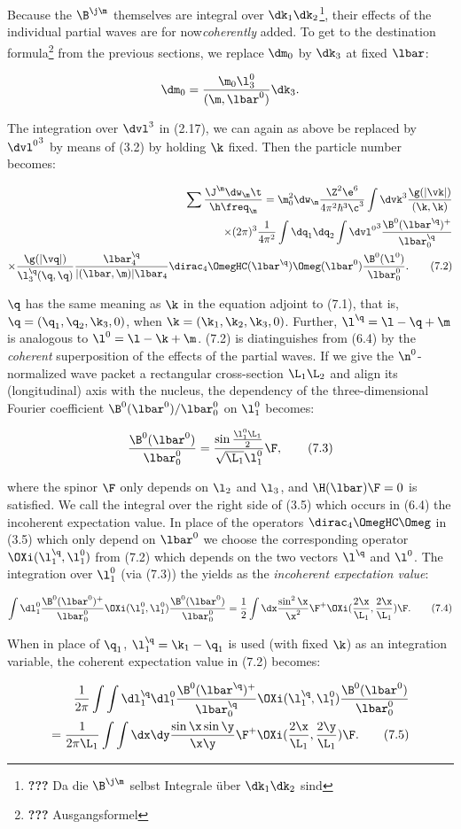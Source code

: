 \documentclass{article}
\newcommand{\WTF}[1]{\footnote{\textbf{???} #1}}
\newcommand{\nequ}[2]{
\begin{align*}
#1
\tag{#2}
\end{align*}
}
\newcommand{\uequ}[1]{
\begin{align*}
#1
\end{align*}
}
\newcommand{\HC}[1]{{#1^{+}}}
\newcommand{\inv}[1]{\frac{1}{#1}}
\renewcommand{\it}[1]{\textit{#1}}
\begin{document}
Because the $\B^{\j\m}$ themselves are integral over $\dk_1\dk_2$\WTF{Da die $\B^{\j\m}$ selbst Integrale über $\dk_1\dk_2$ sind}, their effects of the individual partial waves are for now\it{coherently} added. To get to the destination formula\WTF{Ausgangsformel} from the previous sections, we replace $\dm_0$ by $\dk_3$ at fixed $\lbar$:
\uequ{
\dm_0=\frac{\m_0\l^0_3}{(\m,\lbar^0)}\dk_3.
}
The integration over $\dvl^3$ in (2.17), we can again as above be replaced by ${\dvl^0}^3$ by means of (3.2) by holding $\k$ fixed. Then the particle number becomes:
\nequ{
\sum\frac{\J^\m\dw_\m\t}{\h\freq_\m}
 = \m_0^2\dw_\m\frac{\Z^2\e^6}{4\pi^2\hbar^3\c^3}\int\dvk^3\frac{\g(|\vk|)}{(\k,\k)}\\
 \times (2\pi)^3\inv{4\pi^2}\int\dq_1\dq_2\int{\dvl^0}^3\frac{\HC{\B^0(\lbar^\q)}}{\lbar^\q_0}\\
 \times \frac{\g(|\vq|)}{\l^\q_3(\q,\q)}\frac{\lbar^\q_4}{|(\lbar,\m)|\lbar_4}
        \dirac_4\OmegHC(\lbar^\q)\Omeg(\lbar^0)\frac{\B^0(\l^0)}{\lbar^0_0}.
}{7.2}
$\q$ has the same meaning as $\k$ in the equation adjoint to (7.1), that is, $\q=(\q_1,\q_2,\k_3,0)$, when $\k=(\k_1,\k_2,\k_3,0)$. Further, $\l^\q = \l-\q+\m$ is analogous to $\l^0=\l-\k+\m$. (7.2) is diatinguishes from (6.4) by the \it{coherent} superposition of the effects of the partial waves. If we give the $\n^0$-normalized wave packet a rectangular cross-section $\L_1\L_2$ and align its (longitudinal) axis with the nucleus, the dependency of the three-dimensional Fourier coefficient $\B^0(\lbar^0)/\lbar^0_0$ on $\l^0_1$ becomes:
\nequ{
\frac{\B^0(\lbar^0)}{\lbar^0_0} = \frac{\sin{\frac{\l^0_1\L_1}{2}}}{\sqrt{\L_1}\l^0_1}\F,
}{7.3}
where the spinor $\F$ only depends on $\l_2$ and $\l_3$, and $\H(\lbar)\F=0$ is satisfied. We call the integral over the right side of (3.5) which occurs in (6.4) the incoherent expectation value. In place of the operators $\dirac_4\OmegHC\Omeg$ in (3.5) which only depend on $\lbar^0$ we choose the corresponding operator $\OXi(\l^\q_1,\l^0_1)$ from (7.2) which depends on the two vectors $\l^\q$ and $\l^0$. The integration over $\l^0_1$ (via (7.3)) the yields as the \it{incoherent expectation value}:
\nequ{
\int\dl^0_1 \frac{\HC{\B^0(\lbar^0)}}{\lbar^0_0}\OXi(\l^0_1,\l^0_1)\frac{\B^0(\lbar^0)}{\lbar^0_0}
 = \inv{2}\int\dx\frac{\sin^2\x}{\x^2}\HC{\F}\OXi(\frac{2\x}{\L_1},\frac{2\x}{\L_1})\F.
}{7.4}
When in place of $\q_1$, $\l^\q_1 = \k_1 - \q_1$ is used (with fixed $\k$) as an integration variable, the coherent expectation value in (7.2) becomes:
\nequ{
\inv{2\pi} \int\int\dl^\q_1\dl^0_1 
      \frac{\HC{\B^0(\lbar^\q)}}{\lbar^\q_0}
      \OXi(\l^\q_1,\l^0_1)
      \frac{\B^0(\lbar^0)}{\lbar^0_0}\\
 = \inv{2\pi\L_1}\int\int\dx\dy\frac{\sin\x\sin\y}{\x\y}\HC{\F}\OXi(\frac{2\x}{\L_1},\frac{2\y}{\L_1})\F.
}{7.5}
\end{document}
